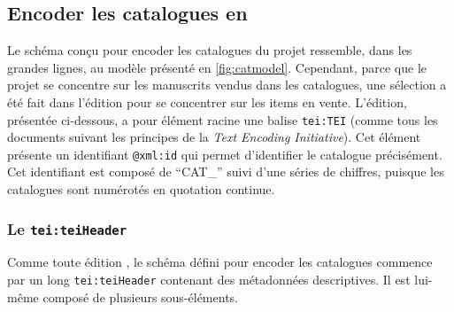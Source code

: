 \subsection{Encoder les catalogues en \tei{}}
Le schéma conçu pour encoder les catalogues du projet \mssktb{} ressemble, dans les grandes lignes, au modèle présenté en \ref{fig:catmodel}. Cependant, parce que le projet se concentre sur les manuscrits vendus dans les catalogues, une sélection a été fait dans l'édition pour se concentrer sur les items en vente. L'édition, présentée ci-dessous, a pour élément racine une balise \texttt{tei:TEI} (comme tous les documents suivant les principes de la \textit{Text Encoding Initiative}). Cet élément présente un identifiant \texttt{@xml:id} qui permet d'identifier le catalogue précisément. Cet identifiant est composé de \enquote{CAT\_} suivi d'une séries de chiffres, puisque les catalogues sont numérotés en quotation continue.

\subsubsection{Le \texttt{tei:teiHeader}}
Comme toute édition \tei{}, le schéma défini pour encoder les catalogues commence par un long \texttt{tei:teiHeader} contenant des métadonnées descriptives. Il est lui-même composé de plusieurs sous-éléments. 


